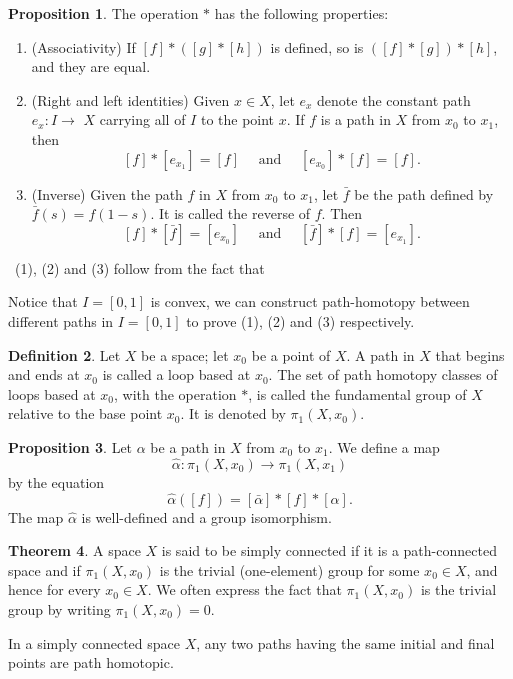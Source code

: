 \documentclass[12pt,a4paper]{book}
\newenvironment{prooff}{{\noindent\it\textcolor{cyan!40!black}{Proof}:}\,}{\par}
\theoremstyle{definition}
\newtheorem{defn}{Definition}[section]
\newtheorem{theo}[defn]{Theorem}
\newtheorem{prop}[defn]{Proposition}
\begin{document}
\begin{prop}
    The operation $*$ has the following properties:
    \begin{enumerate}[(1)]
        \item  (Associativity) If $[f] *([g] *[h])$ is defined, so is $([f] *[g]) *[h]$, and they are equal.
        \item (Right and left identities) Given $x \in X$, let $e_x$ denote the constant path $e_x: I \rightarrow$ $X$ carrying all of $I$ to the point $x$. If $f$ is a path in $X$ from $x_0$ to $x_1$, then
              $$
                  [f] *\left[e_{x_1}\right]=[f] \quad \text { and } \quad\left[e_{x_0}\right] *[f]=[f] .
              $$
        \item  (Inverse) Given the path $f$ in $X$ from $x_0$ to $x_1$, let $\bar{f}$ be the path defined by $\bar{f}(s)=f(1-s)$. It is called the reverse of $f$. Then
              $$
                  [f] *[\bar{f}]=\left[e_{x_0}\right] \quad \text { and } \quad[\bar{f}] *[f]=\left[e_{x_1}\right] .
              $$
    \end{enumerate}
\end{prop}
\begin{prooff}
    (1), (2) and (3) follow from the fact that

    Notice that $I=[0,1]$ is convex, we can construct path-homotopy between different paths in $I=[0,1]$ to prove (1), (2) and (3) respectively.
\end{prooff}
\begin{defn}
    Let $X$ be a space; let $x_0$ be a point of $X$. A path in $X$ that begins and ends at $x_0$ is called a loop based at $x_0$. The set of path homotopy classes of loops based at $x_0$, with the operation $*$, is called the fundamental group of $X$ relative to the base point $x_0$. It is denoted by $\pi_1\left(X, x_0\right)$.
\end{defn}
\begin{prop}
    Let $\alpha$ be a path in $X$ from $x_0$ to $x_1$. We define a map
    $$
        \hat{\alpha}: \pi_1\left(X, x_0\right) \longrightarrow \pi_1\left(X, x_1\right)
    $$
    by the equation
    $$
        \hat{\alpha}([f])=[\bar{\alpha}] *[f] *[\alpha] .
    $$
    The map $\hat{\alpha}$ is well-defined and a group isomorphism.
    \label{proposition: fundamental group, isomorphism induced by path}
\end{prop}
\begin{theo}
    A space $X$ is said to be simply connected if it is a path-connected space and if $\pi_1\left(X, x_0\right)$ is the trivial (one-element) group for some $x_0 \in X$, and hence for every $x_0 \in X$. We often express the fact that $\pi_1\left(X, x_0\right)$ is the trivial group by writing $\pi_1\left(X, x_0\right)=0$.

    In a simply connected space $X$, any two paths having the same initial and final points are path homotopic.
\end{theo}
\end{document}
